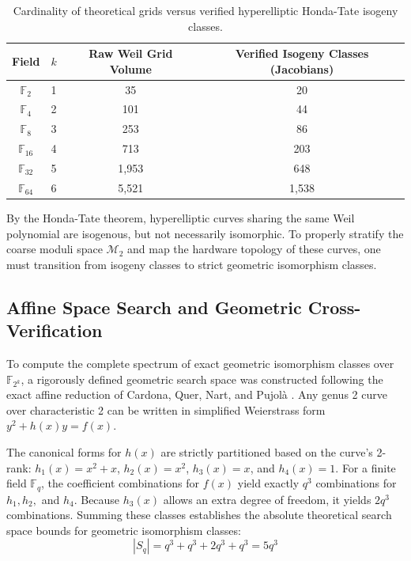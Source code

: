\documentclass[11pt,letterpaper]{article}
\begin{document}
\begin{table}[h!]
\centering
\begin{tabular}{cccc}
\toprule
Field & $k$ & Raw Weil Grid Volume & Verified Isogeny Classes (Jacobians) \\
\midrule
$\mathbb{F}_2$ & 1 & 35 & 20 \\
$\mathbb{F}_4$ & 2 & 101 & 44 \\
$\mathbb{F}_8$ & 3 & 253 & 86 \\
$\mathbb{F}_{16}$ & 4 & 713 & 203 \\
$\mathbb{F}_{32}$ & 5 & 1,953 & 648 \\
$\mathbb{F}_{64}$ & 6 & 5,521 & 1,538 \\
\bottomrule
\end{tabular}
\caption{Cardinality of theoretical grids versus verified hyperelliptic Honda-Tate isogeny classes.}
\label{tab:isogeny_classes}
\end{table}

By the Honda-Tate theorem, hyperelliptic curves sharing the same Weil polynomial are isogenous, but not necessarily isomorphic. To properly stratify the coarse moduli space $\mathcal{M}_2$ \cite{Zobernig2021} and map the hardware topology of these curves, one must transition from isogeny classes to strict geometric isomorphism classes.

\subsection{Affine Space Search and Geometric Cross-Verification}
To compute the complete spectrum of exact geometric isomorphism classes over $\mathbb{F}_{2^k}$, a rigorously defined geometric search space was constructed following the exact affine reduction of Cardona, Quer, Nart, and Pujolà \cite{Cardona2005}. Any genus 2 curve over characteristic 2 can be written in simplified Weierstrass form $y^2 + h(x)y = f(x)$. 

The canonical forms for $h(x)$ are strictly partitioned based on the curve's 2-rank: $h_1(x) = x^2 + x$, $h_2(x) = x^2$, $h_3(x) = x$, and $h_4(x) = 1$. For a finite field $\mathbb{F}_q$, the coefficient combinations for $f(x)$ yield exactly $q^3$ combinations for $h_1, h_2,$ and $h_4$. Because $h_3(x)$ allows an extra degree of freedom, it yields $2q^3$ combinations. Summing these classes establishes the absolute theoretical search space bounds for geometric isomorphism classes:
\begin{equation}
|S_q| = q^3 + q^3 + 2q^3 + q^3 = 5q^3
\end{equation}
\end{document}
